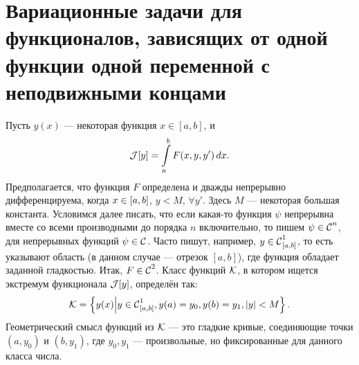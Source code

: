 \section[Задачи с неподвижными концами]{Вариационные задачи для функционалов, зависящих от одной функции одной переменной с неподвижными концами}
\label{lecture1section2}
Пусть $y(x)$ --- некоторая функция $x\in{[a,b]}$, и
\begin{equation*}
	\J[y]=\int\limits_a^b F(x,y,y')\,dx.
\end{equation*}
Предполагается, что функция $F$ определена и дважды непрерывно дифференцируема, когда $x\?\in[a,b]$, $y<M$, $\forall y'$. Здесь $M$ --- некоторая большая константа. Условимся далее писать, что если какая-то функция $\psi$ непрерывна вместе со всеми производными до порядка $n$ включительно, то пишем $\psi\in\Cfn[]{n}$, для непрерывных функций $\psi\in\Cfn[]{}$. Часто пишут, например, $y\in\Cfn[{[a,b]}]{1}$, то есть указывают область (в данном случае --- отрезок ${[a,b]}$), где функция обладает заданной гладкостью. Итак, $F\?\in\Cfn[]{2}$. Класс функций $\mc{K}$, в котором ищется экстремум функционала $\J[y]$, определён так:
\begin{equation*}
	\mc{K}=\left\{y(x)\middle|y\in\Cfn[{[a,b]}]{1}, y(a)=y_0, y(b)=y_1, |y|<M\right\}.
\end{equation*} 
Геометрический смысл функций из $\mc{K}$ --- это гладкие кривые, соединяющие точки $(a,y_0)$ и $(b, y_1)$, где $y_0, y_1$ --- произвольные, но фиксированные для данного класса числа.

